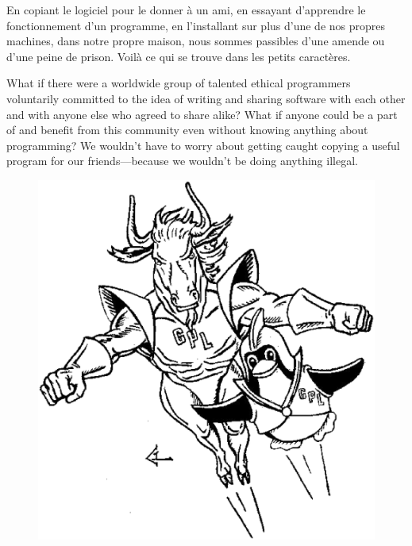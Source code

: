 \documentclass[twoside,12pt]{article}
\begin{document}
En copiant le logiciel pour le donner à un ami, en essayant d'apprendre le
fonctionnement d'un programme, en l'installant sur plus d'une de nos propres
machines, dans notre propre maison, nous sommes passibles d'une amende ou d'une
peine de prison. Voilà ce qui se trouve dans les petits caractères.


What if there were a worldwide group of talented ethical programmers
voluntarily committed to the idea of writing and sharing software with each
other and with anyone else who agreed to share alike? What if anyone could be a
part of and benefit from this community even without knowing anything about
programming? We wouldn't have to worry about getting caught copying a useful
program for our friends---because we wouldn't be doing anything illegal.

\begin{figure}
 \begin{center}
   \includegraphics[scale=0.23]{dynamic-duo-bw.eps}
 \end{center}
\end{figure}
\end{document}
